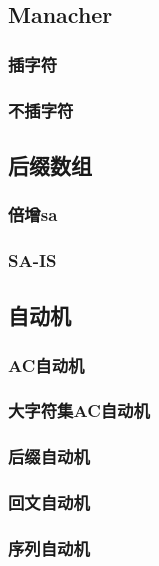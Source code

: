 ﻿\documentclass[a4paper,twocolumn]{article}
\begin{document}
\subsection{Manacher}
\subsubsection{插字符}

\subsubsection{不插字符}

\subsection{后缀数组}
\subsubsection{倍增sa}

\subsubsection{SA-IS}

\subsection{自动机}
\subsubsection{AC自动机}

\subsubsection{大字符集AC自动机}

\subsubsection{后缀自动机}

\subsubsection{回文自动机}

\subsubsection{序列自动机}

\end{document}
